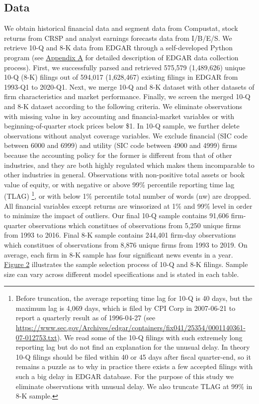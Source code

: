 \documentclass[a4paper]{article}
\begin{document}
\begin{spacing}{2}
\subsection{Data}
We obtain historical financial data and segment data from Compustat, stock returns from CRSP and analyst earnings forecasts data from I/B/E/S. We retrieve 10-Q and 8-K data from EDGAR through a self-developed Python program (see \hyperref[appa]{Appendix A} for detailed description of EDGAR data collection process). First, we successfully parsed and retrieved 575,579 (1,489,626) unique 10-Q (8-K) filings out of 594,017 (1,628,467) existing filings in EDGAR from 1993-Q1 to 2020-Q1. Next, we merge 10-Q and 8-K dataset with other datasets of firm characteristics and market performance. Finally, we screen the merged 10-Q and 8-K dataset according to the following criteria. We eliminate observations with missing value in key accounting and financial-market variables or with beginning-of-quarter stock prices below \$1. In 10-Q sample, we further delete observations without analyst coverage variables. We exclude financial (SIC code between 6000 and 6999) and utility (SIC code between 4900 and 4999) firms because the accounting policy for the former is different from that of other industries, and they are both highly regulated which makes them incomparable to other industries in general. Observations with non-positive total assets or book value of equity, or with negative or above 99\% percentile reporting time lag (TLAG) \footnote{Before truncation, the average reporting time lag for 10-Q is 40 days, but the maximum lag is 4,069 days, which is filed by CPI Corp in 2007-06-21 to report a quarterly result as of 1996-04-27 (see \url{https://www.sec.gov/Archives/edgar/containers/fix041/25354/0001140361-07-012753.txt}). We read some of the 10-Q filings with such extremely long reporting lag but do not find an explanation for the unusual delay. In theory 10-Q filings should be filed within 40 or 45 days after fiscal quarter-end, so it remains a puzzle as to why in practice there exists a few accepted filings with such a big delay in EDGAR database. For the purpose of this study we eliminate observations with unusual delay. We also truncate TLAG at 99\% in 8-K sample.}, or with below 1\% percentile total number of words (nw) are dropped. All financial variables except returns are winsorized at 1\% and 99\% level in order to minimize the impact of outliers. Our final 10-Q sample contains 91,606 firm-quarter observations which constitues of observations from 5,250 unique firms from 1993 to 2016. Final 8-K sample contains 244,401 firm-day observations which constitues of observations from 8,876 unique firms from 1993 to 2019. On average, each firm in 8-K sample has four significant news events in a year. \hyperref[fig2]{Figure 2} illustrates the sample selection process of 10-Q and 8-K filings. Sample size can vary across different model specifications and is stated in each table. 


\end{spacing}
\end{document}

